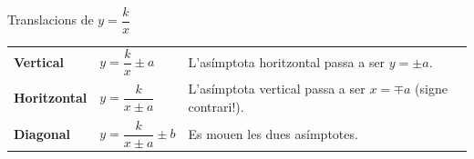 \documentclass[11pt,a4paper]{article}
\makeatletter
\newcommand{\fmm}[1]{\setbox0=\hbox{$#1$}\ifdim\wd0>0.8\linewidth\def\fmmnext{\fmmdisp{#1}}\else\def\fmmnext{\mbox{\box0}}\fi\fmmnext}
\def\fmmdisp#1{\@ifnextchar.{\fmmdispp{#1}}{\@ifnextchar,{\fmmdispc{#1}}{\@ifnextchar;{\fmmdisps{#1}}{\fmdisp{#1}}}}}
\def\fmmdispp#1.{\fmdisp{#1\,.}}\def\fmmdispc#1,{\fmdisp{#1\,,}}\def\fmmdisps#1;{\fmdisp{#1\,;}}
\newcommand{\fmdisp}[1]{\[\setbox2=\hbox{$\displaystyle #1$}\ifdim\wd2>\linewidth\resizebox{\linewidth}{!}{\box2}\else\box2\fi\]}
\makeatother
\begin{document}
\begin{fmprop}{Translacions de $y=\dfrac kx$}

\begin{center}\renewcommand{\arraystretch}{1.5}\small\begin{tabularx}{\linewidth}{>{\raggedright\arraybackslash}p{3.2cm}>{\raggedright\arraybackslash}X>{\raggedright\arraybackslash}X}\toprule
\textbf{Vertical} & $y=\dfrac kx\pm a$ & L'asímptota horitzontal passa a ser $y=\pm a$.\\[3pt]
\textbf{Horitzontal} & $y=\dfrac k{x\pm a}$ & L'asímptota vertical passa a ser $x=\mp a$ (signe contrari!).\\[3pt]
\textbf{Diagonal} & $y=\dfrac k{x\pm a}\pm b$ & Es mouen les dues asímptotes.\\[3pt]
\bottomrule\end{tabularx}\end{center}


\end{fmprop}
\end{document}
